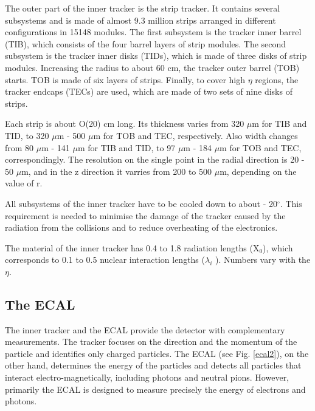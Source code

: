 \begin{normalsize}
The outer part of the inner tracker is the strip tracker. It contains several subsystems and is made of almost 9.3 million strips arranged in different configurations in 15148 modules. The first subsystem is the tracker inner barrel (TIB), which consists of the four barrel layers of strip modules. The second subsystem is the tracker inner disks (TIDs), which is made of three disks of strip modules. Increasing the radius to about 60 cm, the tracker outer barrel (TOB) starts. TOB is made of six layers of strips. Finally, to cover high $\eta$ regions, the tracker endcaps (TECs) are used, which are made of two sets of nine disks of strips. 

Each strip is about O(20) cm long. Its thickness varies from 320 $\mu$m  for TIB and TID, to 320 $\mu$m - 500 $\mu$m  for TOB and TEC, respectively. Also width changes from 80 $\mu$m - 141 $\mu$m for TIB and TID, to 97 $\mu$m - 184 $\mu$m  for TOB and TEC, correspondingly. The resolution on the single point in the radial direction is 20 - 50 $\mu$m, and in the z direction it varries from 200 to 500 $\mu$m, depending on the value of r. 

All subsystems of the inner tracker have to be cooled down to about - 20$^{\circ}$.  This requirement is needed to minimise the damage of the tracker caused by the radiation from the collisions and to reduce overheating of the electronics. 

The material of the inner tracker has 0.4 to 1.8 radiation lengths (X$_0$), which corresponds to 0.1 to 0.5 nuclear interaction lengths ($\lambda_i $ ). Numbers vary with the $\eta$.





\subsection{The ECAL}


The inner tracker and the ECAL provide the detector with complementary measurements. The tracker focuses on the direction and the momentum of the particle and identifies only charged particles. The ECAL  \cite{ECAL_attendum} (see Fig. \ref{ecal2}), on the other hand, determines the energy of the particles and detects all particles that interact electro-magnetically, including photons and neutral pions. However, primarily the ECAL is designed to measure precisely the energy of electrons and photons. 


\end{normalsize}
